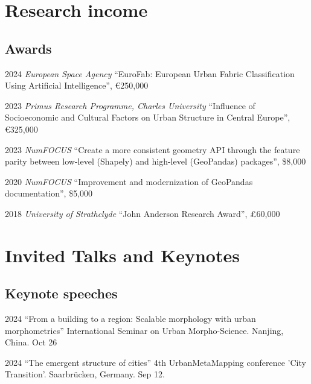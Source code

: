 \documentclass[12pt,a4paper]{report}
\begin{document}
    \section*{Research income}

    \subsection*{Awards}

    \begin{tablist}

        \item[2024] \tab{}\textit{European Space Agency} \enquote{EuroFab: European Urban Fabric Classification Using Artificial Intelligence}, €250,000
        \item[2023] \tab{}\textit{Primus Research Programme, Charles University} \enquote{Influence of Socioeconomic and Cultural Factors on Urban Structure in Central Europe}, €325,000
        \item[2023] \tab{}\textit{NumFOCUS} \enquote{Create a more consistent geometry API through the feature parity between low-level (Shapely) and high-level (GeoPandas) packages}, \$8,000
        \item[2020] \tab{}\textit{NumFOCUS} \enquote{Improvement and modernization of GeoPandas documentation}, \$5,000
        \item[2018] \tab{}\textit{University of Strathclyde} \enquote{John Anderson Research Award}, £60,000

    \end{tablist}

    \section*{Invited Talks and Keynotes}

    \subsection{Keynote speeches}

    \begin{tablist}

        \item[2024] \tab{}\enquote{From a building to a region: Scalable morphology with urban morphometrics} International Seminar on Urban Morpho-Science. Nanjing, China. Oct 26
        \item[2024] \tab{}\enquote{The emergent structure of cities} 4th UrbanMetaMapping conference 'City Transition'. Saarbrücken, Germany. Sep 12.

    \end{tablist}
\end{document}
